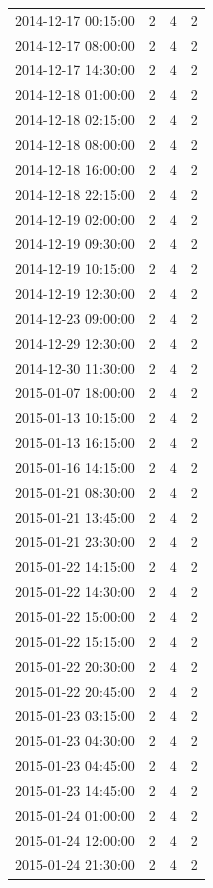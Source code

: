 \begin{tabular}{lrrr}
2014-12-17 00:15:00 & 2 & 4 & 2 \\
2014-12-17 08:00:00 & 2 & 4 & 2 \\
2014-12-17 14:30:00 & 2 & 4 & 2 \\
2014-12-18 01:00:00 & 2 & 4 & 2 \\
2014-12-18 02:15:00 & 2 & 4 & 2 \\
2014-12-18 08:00:00 & 2 & 4 & 2 \\
2014-12-18 16:00:00 & 2 & 4 & 2 \\
2014-12-18 22:15:00 & 2 & 4 & 2 \\
2014-12-19 02:00:00 & 2 & 4 & 2 \\
2014-12-19 09:30:00 & 2 & 4 & 2 \\
2014-12-19 10:15:00 & 2 & 4 & 2 \\
2014-12-19 12:30:00 & 2 & 4 & 2 \\
2014-12-23 09:00:00 & 2 & 4 & 2 \\
2014-12-29 12:30:00 & 2 & 4 & 2 \\
2014-12-30 11:30:00 & 2 & 4 & 2 \\
2015-01-07 18:00:00 & 2 & 4 & 2 \\
2015-01-13 10:15:00 & 2 & 4 & 2 \\
2015-01-13 16:15:00 & 2 & 4 & 2 \\
2015-01-16 14:15:00 & 2 & 4 & 2 \\
2015-01-21 08:30:00 & 2 & 4 & 2 \\
2015-01-21 13:45:00 & 2 & 4 & 2 \\
2015-01-21 23:30:00 & 2 & 4 & 2 \\
2015-01-22 14:15:00 & 2 & 4 & 2 \\
2015-01-22 14:30:00 & 2 & 4 & 2 \\
2015-01-22 15:00:00 & 2 & 4 & 2 \\
2015-01-22 15:15:00 & 2 & 4 & 2 \\
2015-01-22 20:30:00 & 2 & 4 & 2 \\
2015-01-22 20:45:00 & 2 & 4 & 2 \\
2015-01-23 03:15:00 & 2 & 4 & 2 \\
2015-01-23 04:30:00 & 2 & 4 & 2 \\
2015-01-23 04:45:00 & 2 & 4 & 2 \\
2015-01-23 14:45:00 & 2 & 4 & 2 \\
2015-01-24 01:00:00 & 2 & 4 & 2 \\
2015-01-24 12:00:00 & 2 & 4 & 2 \\
2015-01-24 21:30:00 & 2 & 4 & 2 \\

\end{tabular}
